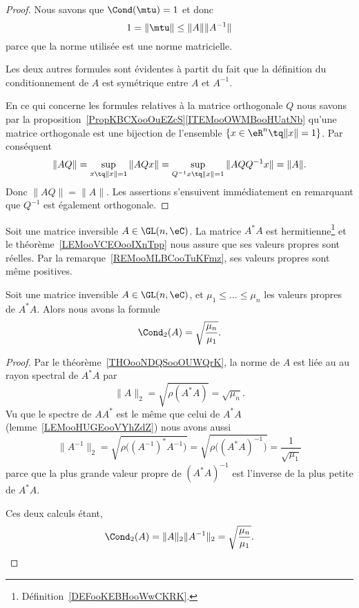 \begin{proof}
	Nous savons que \( \Cond(\mtu)=1\) et donc
	\begin{equation}
		1=\| \mtu \|\leq \| A \|\| A^{-1} \|
	\end{equation}
	parce que la norme utilisée est une norme matricielle.

	Les deux autres formules sont évidentes à partit du fait que la définition du conditionnement de \( A\) est symétrique entre \( A\) et \( A^{-1}\).

	En ce qui concerne les formules relatives à la matrice orthogonale \( Q\) nous savons par la proposition~\ref{PropKBCXooOuEZcS}\ref{ITEMooOWMBooHUatNb} qu'une matrice orthogonale est une bijection de l'ensemble \(  \{ x\in \eR^n\tq \| x \|=1 \}  \). Par conséquent
	\begin{equation}
		\| AQ \|=\sup_{x\tq \| x \|=1}\| AQx \|=\sup_{ Q^{-1}x\tq \| x \|=1  }\| AQQ^{-1}x \|=\| A \|.
	\end{equation}
	Donc \( \| AQ \|=\| A \|\). Les assertions s'ensuivent immédiatement en remarquant que \( Q^{-1}\) est également orthogonale.
\end{proof}

Soit une matrice inversible \( A\in \GL(n,\eC)\). La matrice \( A^*A\) est hermitienne\footnote{Définition~\ref{DEFooKEBHooWwCKRK}.} et le théorème~\ref{LEMooVCEOooIXnTpp} nous assure que ses valeurs propres sont réelles. Par la remarque~\ref{REMooMLBCooTuKFmz}, ses valeurs propres sont même positives.

\begin{proposition}      \label{PROPooNUAUooIbVgcN}
	Soit une matrice inversible \( A\in\GL(n,\eC)\), et \( \mu_1\leq\ldots\leq \mu_n\) les valeurs propres de \( A^*A\). Alors nous avons la formule
	\begin{equation}
		\Cond_2(A)=\sqrt{ \frac{ \mu_n }{ \mu_1 }}.
	\end{equation}
\end{proposition}

\begin{proof}
	Par le théorème~\ref{THOooNDQSooOUWQrK}, la norme de \( A\) est liée au au rayon spectral de \( A^*A\) par
	\begin{equation}
		\| A \|_2=\sqrt{ \rho(A^*A) }=\sqrt{ \mu_n }.
	\end{equation}
	Vu que le spectre de \( AA^*\) est le même que celui de \( A^*A\) (lemme~\ref{LEMooHUGEooVYhZdZ}) nous avons aussi
	\begin{equation}
		\| A^{-1} \|_2=\sqrt{ \rho\big( (A^{-1})^*A^{-1} \big) }=\sqrt{ \rho\big( (A^*A)^{-1} \big) }=\frac{1}{ \sqrt{ \mu_1 } }
	\end{equation}
	parce que la plus grande valeur propre de \( (A^*A)^{-1}\) est l'inverse de la plus petite de \( A^*A\).

	Ces deux calculs étant,
	\begin{equation}
		\Cond_2(A)=\| A \|_2\| A^{-1} \|_2=\sqrt{ \frac{ \mu_n }{ \mu_1 } }.
	\end{equation}
\end{proof}

